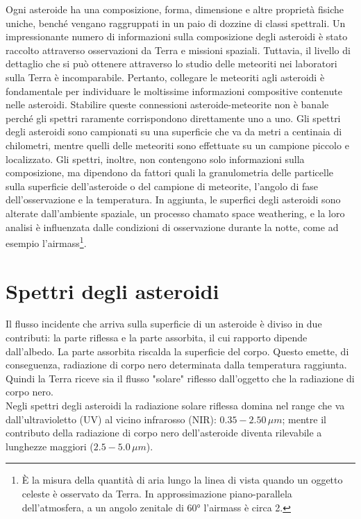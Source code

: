 \documentclass[a4paper,11pt,openright]{book}
\begin{document}
Ogni asteroide ha una composizione, forma, dimensione e altre proprietà fisiche uniche, benché vengano raggruppati in un paio di dozzine di classi spettrali. Un impressionante numero di informazioni sulla composizione degli asteroidi è stato raccolto attraverso osservazioni da Terra e missioni spaziali. Tuttavia, il livello di dettaglio che si può ottenere attraverso lo studio delle meteoriti nei laboratori sulla Terra è incomparabile. Pertanto, collegare le meteoriti agli asteroidi è fondamentale per individuare le moltissime informazioni compositive contenute nelle asteroidi. Stabilire queste connessioni asteroide-meteorite non è banale perché gli spettri raramente corrispondono direttamente uno a uno. Gli spettri degli asteroidi sono campionati su una superficie che va da metri a centinaia di chilometri, mentre quelli delle meteoriti sono effettuate su un campione piccolo e localizzato. Gli spettri, inoltre, non contengono solo informazioni sulla composizione, ma dipendono da fattori quali la granulometria delle particelle sulla superficie dell'asteroide o del campione di meteorite, l'angolo di fase dell'osservazione e la temperatura. In aggiunta, le superfici degli asteroidi sono alterate dall'ambiente spaziale, un processo chamato space weathering, e la loro analisi è influenzata dalle condizioni di osservazione durante la notte, come ad esempio l'airmass\footnote{È la misura della quantità di aria lungo la linea di vista quando un oggetto celeste è osservato da Terra. In approssimazione piano-parallela dell'atmosfera, a un angolo zenitale di 60° l'airmass è circa 2.}.



\section{Spettri degli asteroidi}
Il flusso incidente che arriva sulla superficie di un asteroide è diviso in due contributi: la parte riflessa e la parte assorbita, il cui rapporto dipende dall'albedo. La parte assorbita riscalda la superficie del corpo. Questo emette, di conseguenza, radiazione di corpo nero determinata dalla temperatura raggiunta. Quindi la Terra riceve sia il flusso "solare" riflesso dall'oggetto che la radiazione di corpo nero.\\
Negli spettri degli asteroidi la radiazione solare riflessa domina nel range che va dall'ultravioletto (UV) al vicino infrarosso (NIR): $0.35-2.50\,\mu m$; mentre il contributo della radiazione di corpo nero dell'asteroide diventa rilevabile a lunghezze maggiori ($2.5-5.0\,\mu m$).
\end{document}
